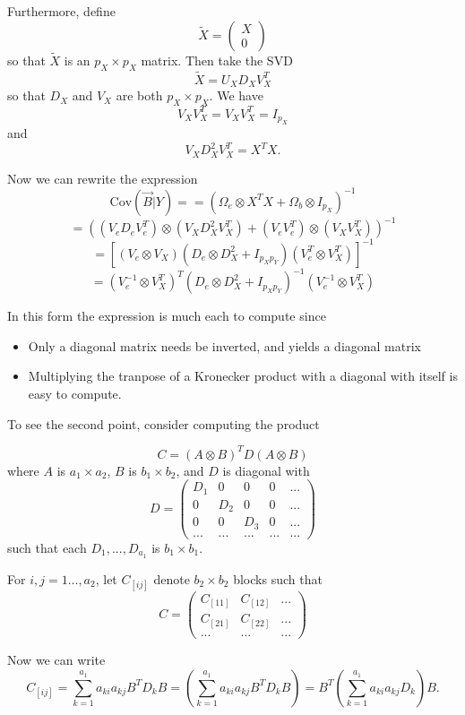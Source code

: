 \documentclass[12pt]{article}
\begin{document}
Furthermore, define 
$$\tilde{X} = \begin{pmatrix} X \\ 0\end{pmatrix}$$ so that $\tilde{X}$ is an $p_X \times p_X$ matrix.
Then take the SVD
$$
\tilde{X} = U_X D_X V_X^T
$$
so that $D_X$ and $V_X$ are both  $p_X \times p_X$.
We have
$$
V_X V_X^T = V_X V_X^T = I_{p_X}
$$
and
$$
V_X D_X^2 V_X^T = X^T X.
$$

Now we can rewrite the expression
$$
\text{Cov}(\vec{B}|Y) = = (\Omega_e \otimes X^T X + \Omega_b \otimes I_{p_X})^{-1}
$$
$$
= ((V_e D_e V_e^T) \otimes (V_X D_X^2 V_X^T) + (V_e V_e^T) \otimes (V_X V_X^T))^{-1}
$$
$$
= [(V_e \otimes V_X) (D_e \otimes D_X^2+ I_{p_X p_Y})(V_e^T \otimes V_X^T)]^{-1}
$$
$$
= (V_e^{-1} \otimes V_X^{T})^T (D_e \otimes D_X^2+ I_{p_X p_Y})^{-1} (V_e^{-1} \otimes V_X^{T})
$$

In this form the expression is much each to compute since
\begin{itemize}
\item Only a diagonal matrix needs be inverted, and yields a diagonal matrix
\item Multiplying the tranpose of a Kronecker product with a diagonal with itself is easy to compute.
\end{itemize}
To see the second point, consider computing the product

$$
C = (A \otimes B)^T D (A \otimes B)
$$
where $A$ is $a_1 \times a_2$, $B$ is $b_1 \times b_2$, and $D$ is diagonal with
$$
D = \begin{pmatrix} D_1 & 0 & 0 & 0 &... \\
0 & D_2 & 0 & 0 & ...\\
0 & 0 & D_3 & 0 & ...\\
... & ...& ... & ... & ...
\end{pmatrix}
$$
such that each $D_1,..., D_{a_1}$ is $b_1 \times b_1$.

For $i, j = 1..., a_2$, let $C_{[ij]}$ denote $b_2 \times b_2$ blocks such that
$$
C = \begin{pmatrix} C_{[11]} & C_{[12]} & ...\\
C_{[21]} & C_{[22]} & ... \\
... & ... & ...\end{pmatrix}
$$

Now we can write
$$
C_{[ij]} = \sum_{k=1}^{a_1} a_{ki}a_{kj} B^T D_k B 
= \left(\sum_{k=1}^{a_1} a_{ki} a_{kj} B^T D_k B \right)
= B^T \left(\sum_{k=1}^{a_1} a_{ki} a_{kj} D_k \right) B.
$$
\end{document}
